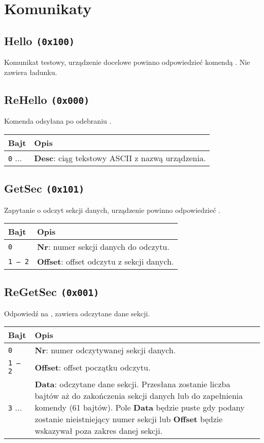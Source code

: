 \newpage

\section{Komunikaty}
\label{Sec_komunikaty}

\subsection{Hello \texttt{(0x100)}}
\label{hello}
Komunikat testowy, urządzenie docelowe powinno odpowiedzieć komendą . Nie zawiera ładunku.

\subsection{ReHello \texttt{(0x000)}}
\label{reHello}
Komenda odsyłana po odebraniu .
\begin{longtable}{|p{\BWIDTH}|p{\OWIDTH}|}
	\hline
	\textbf{Bajt} & \textbf{Opis}\\ 
	\hline
	\hline
	\texttt{0} ... & \textbf{Desc}: ciąg tekstowy ASCII z nazwą urządzenia.\\
	\hline
\end{longtable}

\subsection{GetSec \texttt{(0x101)}}
\label{getSec}
Zapytanie o odczyt sekcji danych, urządzenie powinno odpowiedzieć .
\begin{longtable}{|p{\BWIDTH}|p{\OWIDTH}|}
	\hline
	\textbf{Bajt} & \textbf{Opis}\\ 
	\hline
	\hline
	\texttt{0} & \textbf{Nr}: numer sekcji danych do odczytu.\\
	\hline
	\texttt{1 -- 2} & \textbf{Offset}: offset odczytu z sekcji danych.\\
	\hline
\end{longtable}

\subsection{ReGetSec \texttt{(0x001)}}
\label{reGetSec}
Odpowiedź na , zawiera odczytane dane sekcji.
\begin{longtable}{|p{\BWIDTH}|p{\OWIDTH}|}
	\hline
	\textbf{Bajt} & \textbf{Opis}\\ 
	\hline
	\hline
	\texttt{0} & \textbf{Nr}: numer odczytywanej sekcji danych.\\
	\hline
	\texttt{1 -- 2} & \textbf{Offset}: offset początku odczytu.\\
	\hline
	\texttt{3} ... & \textbf{Data}: odczytane dane sekcji. Przesłana zostanie liczba bajtów aż do zakończenia sekcji danych lub do zapełnienia komendy (61 bajtów). Pole \textbf{Data} będzie puste gdy podany zostanie nieistniejący numer sekcji lub \textbf{Offset} będzie wskazywał poza zakres danej sekcji.\\
	\hline
\end{longtable}